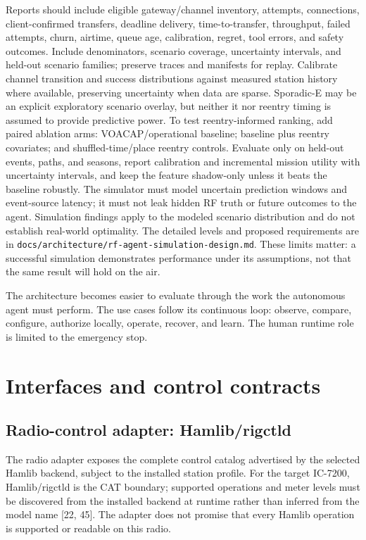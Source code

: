 \documentclass[11pt,a4paper]{article}
\begin{document}
Reports should include eligible gateway/channel inventory, attempts,
connections, client-confirmed transfers, deadline delivery, time-to-transfer,
throughput, failed attempts, churn, airtime, queue age, calibration, regret,
tool errors, and safety outcomes. Include denominators, scenario coverage,
uncertainty intervals, and held-out scenario families; preserve traces and
manifests for replay. Calibrate channel transition and success distributions
against measured station history where available, preserving uncertainty when
data are sparse. Sporadic-E may be an explicit exploratory scenario overlay,
but neither it nor reentry timing is assumed to provide predictive power. To
test reentry-informed ranking, add paired ablation arms: VOACAP/operational
baseline; baseline plus reentry covariates; and shuffled-time/place reentry
controls. Evaluate only on held-out events, paths, and seasons, report
calibration and incremental mission utility with uncertainty intervals, and
keep the feature shadow-only unless it beats the baseline robustly. The
simulator must model uncertain prediction windows and event-source latency;
it must not leak hidden RF truth or future outcomes to the agent. Simulation
findings apply to the modeled scenario distribution and do not establish
real-world optimality. The detailed levels and proposed requirements are in
\texttt{docs/architecture/rf-agent-simulation-design.md}.
These limits matter: a successful simulation demonstrates performance under
its assumptions, not that the same result will hold on the air.

The architecture becomes easier to evaluate through the work the autonomous
agent must perform. The use cases follow its continuous loop: observe, compare,
configure, authorize locally, operate, recover, and learn. The human runtime
role is limited to the emergency stop.

\section{Interfaces and control contracts}

\subsection{Radio-control adapter: Hamlib/rigctld}
The radio adapter exposes the complete control catalog advertised by the selected Hamlib backend, subject to the installed station profile. For the target IC-7200, Hamlib/rigctld is the CAT boundary; supported operations and meter levels must be discovered from the installed backend at runtime rather than inferred from the model name [22, 45]. The adapter does not promise that every Hamlib operation is supported or readable on this radio.
\end{document}
